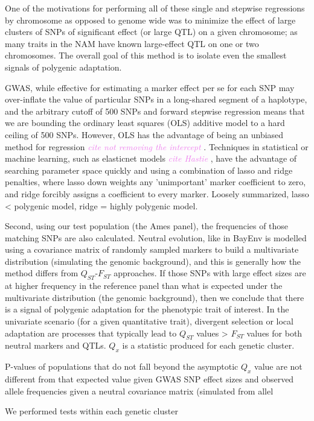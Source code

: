 \documentclass[9pt,twocolumn,twoside]{gsajnl}
\newcommand{\kc}[1]{\textcolor{violet}{ \emph{ #1}} }
\begin{document}
One of the motivations for performing all of these single and stepwise regressions by chromosome as opposed to genome wide was to minimize the effect of large clusters of SNPs of significant effect (or large QTL) on a given chromosome; as many traits in the NAM have known large-effect QTL on one or two chromosomes. The overall goal of this method is to isolate even the smallest signals of polygenic adaptation. 

GWAS, while effective for estimating a marker effect per se for each SNP may over-inflate the value of particular SNPs in a long-shared segment of a haplotype, and the arbitrary cutoff of 500 SNPs and forward stepwise regression means that we are bounding the ordinary least squares (OLS) additive model to a hard ceiling of 500 SNPs. However, OLS has the advantage of being an unbiased method for regression \kc{cite not removing the intercept}. Techniques in statistical or machine learning, such as elasticnet models \kc{cite Hastie}, have the advantage of searching parameter space quickly and using a combination of lasso and ridge penalties, where lasso down weights any 'unimportant' marker coefficient to zero, and ridge forcibly assigns a coefficient to every marker. Loosely summarized, lasso < polygenic model, ridge = highly polygenic model.  

Second, using our test population (the Ames panel), the frequencies of those matching SNPs are also calculated. 
Neutral evolution, like in BayEnv is modelled using a covariance matrix of randomly sampled markers to build a multivariate distribution (simulating the genomic background), and this is generally how the method differs from $Q_{ST}$-$F_{ST}$ approaches.
If those SNPs with large effect sizes are at higher frequency in the reference panel than what is expected under the multivariate distribution (the genomic background), then we conclude that there is a signal of polygenic adaptation for the phenotypic trait of interest.
In the univariate scenario (for a given quantitative trait), divergent selection or local adaptation are processes that typically lead to $Q_{ST}$ values > $F_{ST}$ values for both neutral markers and QTLs.
$Q_x$ is a statistic produced for each genetic cluster.

 
P-values of populations that do not fall beyond the asymptotic $Q_x$ value are not different from that expected value given GWAS SNP effect sizes and observed allele frequencies given a neutral covariance matrix (simulated from allel

We performed tests within each genetic cluster
\end{document}
